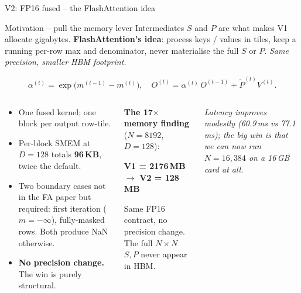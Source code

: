 \documentclass[10pt,aspectratio=169]{beamer}
\begin{document}
\begin{frame}{V2: FP16 fused -- the FlashAttention idea}
  \begin{block}{Motivation -- pull the memory lever}
    Intermediates $S$ and $P$ are what makes V1 allocate gigabytes.
    \textbf{FlashAttention's idea}: process keys / values in tiles,
    keep a running per-row max and denominator, never materialise the
    full $S$ or $P$. \emph{Same precision, smaller HBM footprint.}
  \end{block}
  \[
    \alpha^{(t)} = \exp\bigl(m^{(t-1)} - m^{(t)}\bigr),\quad
    O^{(t)} = \alpha^{(t)}\, O^{(t-1)} + \tilde P^{(t)} V^{(t)}.
  \]
  \begin{columns}[T]
      \begin{whatif}
        \begin{itemize}
          \item One fused kernel; one block per output row-tile.
          \item Per-block SMEM at $D = 128$ totals \textbf{96\,KB},
                twice the default.
          \item Two boundary cases not in the FA paper but required:
                first iteration ($m = -\infty$), fully-masked rows.
                Both produce NaN otherwise.
          \item \textbf{No precision change.} The win is purely
                structural.
        \end{itemize}
      \end{whatif}
      \begin{numbers}
        \textbf{The 17$\times$ memory finding} ($N = 8192$, $D = 128$):
        \begin{center}
          \textbf{V1 = 2176\,MB} $\to$ \textbf{V2 = 128\,MB}
        \end{center}
        Same FP16 contract, no precision change. The full $N{\times}N$
        $S, P$ never appear in HBM.
      \end{numbers}
      {\small\itshape Latency improves modestly (60.9\,ms vs 77.1\,ms);
      the big win is that we can now run $N = 16{,}384$ on a 16\,GB
      card at all.}
  \end{columns}
\end{frame}
\end{document}
